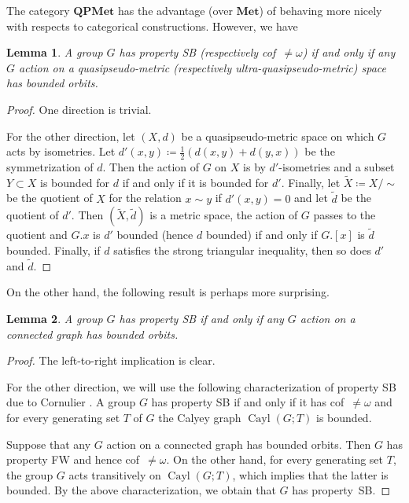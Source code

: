\documentclass[a4paper]{article}
\newcounter{mycomment}
\newcommand{\mycomment}[2][]{\refstepcounter{mycomment}{\todo[color={green!33},size=\small]{\textbf{Commentaire [\uppercase{#1}\themycomment]:}~#2}}}
\newcommand{\PH}[1]{\todo[color={blue!33},size=small]{#1}}
\newcommand{\GS}[1]{\mycomment[GS]{#1}}
\newtheorem{lem}{Lemma}[section]
\theoremstyle{definition}
\DeclareMathOperator\Cayley{Cayl}
\begin{document}
The category $\mathbf{QPMet}$ has the advantage (over $\mathbf{Met}$) of behaving more nicely with respects to categorical constructions.
However, we have%
%
%
\begin{lem}\label{Lemma:BergQPMet}
A group $G$ has property SB (respectively cof~$\neq\omega$) if and only if any $G$ action on a quasipseudo-metric (respectively ultra-quasipseudo-metric) space has bounded orbits.
\end{lem}
\begin{proof}
One direction is trivial.

For the other direction, let $(X,d)$ be a quasipseudo-metric space on which $G$ acts by isometries.
Let $d'(x,y)\coloneqq\frac12(d(x,y)+d(y,x))$ be the symmetrization of $d$.
Then the action of $G$ on $X$ is by $d'$-isometries and a subset $Y\subset X$ is bounded for $d$ if and only if it is bounded for $d'$.
Finally, let $\tilde X\coloneqq X/\sim$ be the quotient of $X$ for the relation $x\sim y$ if $d'(x,y)=0$ and let $\tilde d$ be the quotient of $d'$.
Then $(\tilde X,\tilde d)$ is a metric space, the action of $G$ passes to the quotient and $G.x$ is $d'$ bounded (hence $d$ bounded) if and only if $G.[x]$ is $\tilde d$ bounded.
Finally, if $d$ satisfies the strong triangular inequality, then so does $d'$ and $\tilde d$.
\end{proof}
%
%
On the other hand, the following result is perhaps more surprising.
%
%
\begin{lem}%
A group $G$ has property SB if and only if any $G$ action on a connected graph has bounded orbits.
\end{lem}
\begin{proof}
The left-to-right implication is clear.

For the other direction, we will use the following characterization of property SB due to Cornulier \cite{MR2240370}. A group $G$ has property SB if and only if it has cof~$\neq\omega$ and for every generating set $T$ of $G$ the Calyey graph $\Cayley(G;T)$ is bounded.

Suppose that any $G$ action on a connected graph has bounded orbits. Then $G$ has property FW and hence cof~$\neq\omega$. On the other hand, for every generating set $T$, the group $G$ acts transitively on $\Cayley(G;T)$, which implies that the latter is bounded. By the above characterization, we obtain that $G$ has property~SB.
\end{proof}
\end{document}
